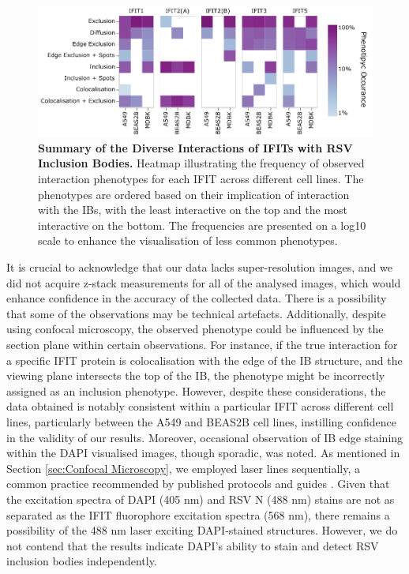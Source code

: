 \begin{figure}
    \centering
    \includegraphics[width=1\linewidth]{08. Chapter 3/Figs/heatmap_infection.pdf}
    \caption[Summary of the Diverse Interactions of IFITs with RSV Inclusion Bodies.]{\textbf{Summary of the Diverse Interactions of IFITs with RSV Inclusion Bodies.} Heatmap illustrating the frequency of observed interaction phenotypes for each IFIT across different cell lines. The phenotypes are ordered based on their implication of interaction with the IBs, with the least interactive on the top and the most interactive on the bottom. The frequencies are presented on a log10 scale to enhance the visualisation of less common phenotypes.}
    \label{fig:Summary of the Diverse Interactions of IFITs with RSV Inclusion Bodies}
\end{figure}

It is crucial to acknowledge that our data lacks super-resolution images, and we did not acquire z-stack measurements for all of the analysed images, which would enhance confidence in the accuracy of the collected data. There is a possibility that some of the observations may be technical artefacts. Additionally, despite using confocal microscopy, the observed phenotype could be influenced by the section plane within certain observations. For instance, if the true interaction for a specific IFIT protein is colocalisation with the edge of the IB structure, and the viewing plane intersects the top of the IB, the phenotype might be incorrectly assigned as an inclusion phenotype. However, despite these considerations, the data obtained is notably consistent within a particular IFIT across different cell lines, particularly between the A549 and BEAS2B cell lines, instilling confidence in the validity of our results. Moreover, occasional observation of IB edge staining within the DAPI visualised images, though sporadic, was noted. As mentioned in Section \ref{sec:Confocal Microscopy}, we employed laser lines sequentially, a common practice recommended by published protocols and guides \cite{Jonkman2020Tutorial:Microscopy}. Given that the excitation spectra of DAPI (405 nm) and RSV N (488 nm) stains are not as separated as the IFIT fluorophore excitation spectra (568 nm), there remains a possibility of the 488 nm laser exciting DAPI-stained structures. However, we do not contend that the results indicate DAPI's ability to stain and detect RSV inclusion bodies independently.

